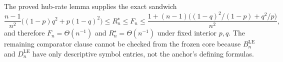 The proved hub-rate lemma supplies the exact sandwich
\[
 \frac{n-1}{n^2}\bigl((1-p)q^2+p(1-q)^2\bigr)
 \le R_n^{\star}\le F_n
 \le \frac{1+(n-1)\bigl((1-q)^2/(1-p)+q^2/p\bigr)}{n^2},
\]
and therefore \(F_n=\Theta(n^{-1})\) and \(R_n^{\star}=\Theta(n^{-1})\) under fixed interior \(p,q\).  The remaining comparator clause cannot be checked from the frozen core because \(B_n^{\mathrm{LE}}\) and \(D_n^{\mathrm{LE}}\) have only descriptive symbol entries, not the anchor's defining formulas.